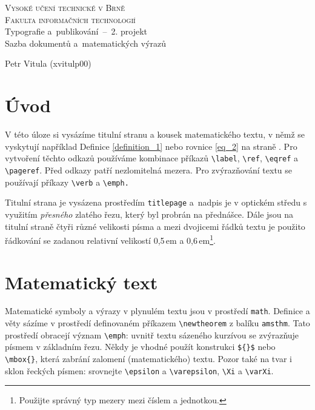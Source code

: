 \documentclass[a4paper, 11pt, twocolumn]{article}
\theoremstyle{definition}
\begin{document}
    \begin{titlepage}
		\begin{center}
			{\Huge\textsc{
				\textsc{\Huge{Vysoké učení technické v Brně}\\[0.5em]
                \quad\huge{Fakulta informačních technologií}}
			}}
			{\LARGE
				\\ Typografie a~publikování \,--\ 2. projekt\\[0.6em]
				Sazba dokumentů a~matematických výrazů
			}
            
		\end{center}

		{\Large
			\the\year
			\hfill
			Petr Vitula (xvitulp00)
		}
	\end{titlepage}

    \section*{Úvod}

	V této úloze si vysázíme titulní stranu a kousek matematického textu, v němž se vyskytují například Definice \ref{definition_1} nebo rovnice \eqref{eq_2} na straně \pageref{definition_matematika}. Pro vytvoření
    těchto odkazů používáme kombinace příkazů \verb|\label|,
    \verb|\ref|, \verb|\eqref| a \verb|\pageref|. Před odkazy patří nezlomitelná mezera. Pro zvýrazňování textu se používají
    příkazy \verb|\verb| a \verb|\emph.|
    
    Titulní strana je vysázena prostředím \verb|titlepage|
    a~nadpis je v optickém středu s využitím \emph{přesného} zlatého řezu, který byl probrán na přednášce. Dále jsou
    na titulní straně čtyři různé velikosti písma a mezi
    dvojicemi řádků textu je použito řádkování se zadanou relativní velikostí 0,5\,em a 0,6\,em\footnote{Použijte správný typ mezery mezi číslem a jednotkou.}.
    
    \section{Matematický text}

	Matematické symboly a výrazy v plynulém textu jsou
    v prostředí \verb|math|. Definice a věty sázíme v prostředí
    definovaném příkazem \verb|\newtheorem| z balíku \verb|amsthm|.
    Tato prostředí obracejí význam \verb|\emph|: uvnitř textu
    sázeného kurzívou se zvýrazňuje písmem v základním řezu. Někdy je vhodné použít konstrukci \verb|${}$|
    nebo \verb|\mbox{}|, která zabrání zalomení (matematického) textu. Pozor také na tvar i sklon řeckých písmen:
    srovnejte \verb|\epsilon| a \verb|\varepsilon|, \verb|\Xi| a \verb|\varXi|.
\end{document}
